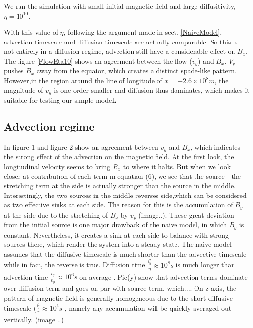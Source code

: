 \documentclass[11pt]{article}
\begin{document}
We ran the simulation with small initial magnetic field and large diffusitivity, $\eta = 10^{10}$.

With this value of $\eta$, following the argument made in sect. \ref{NaiveModel}, advection timescale and diffusion timescale are actually comparable. So this is not entirely in a diffusion regime, advection still have a considerable effect on $B_x$. The figure \ref{FlowEta10} shows an agreement between the flow ($v_y$) and $B_x$. $V_y$ pushes $B_x$ away from the equator, which creates a distinct spade-like pattern. However,in the region around the line of longitude of $x = -2.6 \times 10^{8} m $, the magnitude of $v_y$ is one order smaller and diffusion thus dominates, which makes it suitable for testing our simple modeL.

\subsection{Advection regime}
In figure 1 and figure 2 show an agreement between $v_y$ and $B_x$, which indicates the strong effect of the advection on the magnetic field. At the first look, the longitudinal velocity seems to bring $B_x$ to where it halts. But when we look closer at contribution of each term in equation (6), we see that the source - the stretching term at the side is actually stronger than the source in the middle. Interestingly, the two sources in the middle reverses side,which can be considered as two effective sinks at each side. The reason for this is the accumulation of $B_y$ at the side due to the stretching of $B_x$ by $v_y$ (image..). These great deviation from the initial source is one major drawback of the naive model, in which $B_y$ is constant. Nevertheless, it creates a sink at each side to balance with strong sources there, which render the system into a steady state. 	
The naive model assumes that the diffusive timescale is much shorter than the advective timescale while in fact, the reverse is true. Diffusion time $\frac{l_y^2}{\eta} \approx 10^8 s $  is much longer than advection time $ \frac{l_y}{v_y} \approx 10^6 s$ on average . Pic(y) show that advection terms dominate over diffusion term and goes on par with source term, which.... On z axis, the pattern of magnetic field is generally homogeneous due to the short diffusive timescale ($\frac{l_z^2}{\eta} \approx 10^6 s $ , namely any accumulation will be quickly averaged out vertically. (image ..)
\end{document}
